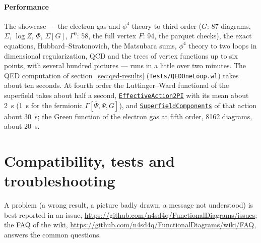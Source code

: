 \documentclass[11pt,a4paper]{article}
\newcommand{\pkg}[1]{\texttt{#1}}
\newcommand{\fnref}[1]{\hyperref[fn:#1]{\pkg{#1}}}
\begin{document}
\paragraph{Performance} The showcase --- the electron gas and $\phi^4$ theory to third order ($G$: 87
diagrams, $\Sigma$, $\log Z$, $\Phi$, $\Sigma[G]$, $\Gamma^0$: 58, the full vertex $F$: 94, the parquet checks), the exact
equations, Hubbard--Stratonovich, the Matsubara sums, $\phi^4$ theory to two loops in dimensional regularization, QCD and
the trees of vertex functions up to six points, with several hundred pictures --- runs in a little over two minutes.
The QED computation of section~\ref{sec:qed-results} (\pkg{Tests/QEDOneLoop.wl}) takes about ten seconds. At fourth
order the Luttinger--Ward functional of the superfield takes about half a second, \fnref{EffectiveAction2PI} with its
mean about 2~s (1~s for the fermionic $\Gamma[\bar\Psi,\Psi,G]$), and \fnref{SuperfieldComponents} of that action
about 30~s; the Green function of the electron gas at fifth order, 8162 diagrams, about 20~s.

\section{Compatibility, tests and troubleshooting}\label{sec:troubleshooting}

A problem (a wrong result, a picture badly drawn, a message not understood) is best reported in an issue,
\url{https://github.com/n4sd4q/FunctionalDiagrams/issues}; the FAQ of the wiki,
\url{https://github.com/n4sd4q/FunctionalDiagrams/wiki/FAQ}, answers the common questions.
\end{document}
